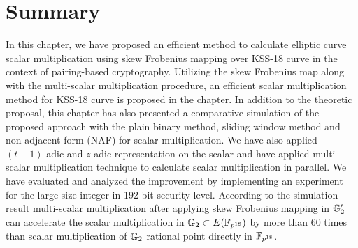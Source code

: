 \section{Summary}
In this chapter, we have proposed an efficient method to calculate elliptic curve scalar multiplication using skew Frobenius mapping over KSS-18 curve in the context of pairing-based cryptography. 
Utilizing the skew Frobenius map along with the multi-scalar multiplication procedure, an efficient scalar multiplication method for KSS-18 curve is proposed in the chapter.
In addition to the theoretic proposal, this chapter has also presented a comparative simulation of the proposed approach with the plain binary method, sliding window method and non-adjacent form (NAF) for scalar multiplication. 
We have also applied $(t-1)$-adic and $z$-adic representation on the scalar and have applied multi-scalar multiplication technique to calculate scalar multiplication in parallel. 
We have evaluated and analyzed the improvement by implementing an experiment for the large size integer in 192-bit security level. 
According to the simulation result multi-scalar multiplication after applying skew Frobenius mapping in ${\mathbb{G}}_{2}'$ can accelerate the scalar multiplication in ${\mathbb{G}}_{2} \subset E(\mathbb{F}_{p^{18}})$ by more than 60 times than scalar multiplication of ${\mathbb{G}}_{2}$ rational point directly in $\mathbb{F}_{p^{18}}$. 
